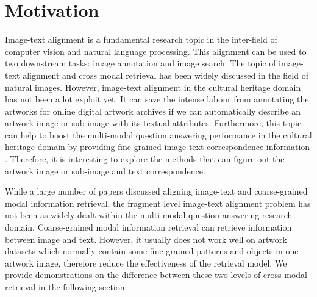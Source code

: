 \section{Motivation}
Image-text alignment is a fundamental research topic in the inter-field of computer vision and natural language processing. 
This alignment can be used to two downstream tasks: image annotation and image search. The topic of image-text alignment and cross modal retrieval has been widely discussed in the field of natural images. However, image-text alignment in the cultural heritage domain has not been a lot exploit yet. It can save the intense labour from annotating the artworks for online digital artwork archives if we can automatically describe an artwork image or sub-image with its textual attributes. Furthermore, this topic can help to boost the multi-modal question answering performance in the cultural heritage domain by providing fine-grained image-text correspondence information \cite{mqa}. Therefore, it is interesting to explore the methods that can figure out the artwork image or sub-image and text correspondence.

While a large number of papers discussed aligning image-text and coarse-grained modal information retrieval, the fragment level image-text alignment problem has not been as widely dealt within the multi-modal question-answering research domain. Coarse-grained modal information retrieval can retrieve information between image and text. However, it usually does not work well on artwork datasets which normally contain some fine-grained patterns and objects in one artwork image, therefore reduce the effectiveness of the retrieval model. We provide demonstrations on the difference between these two levels of cross modal retrieval in the following section.




